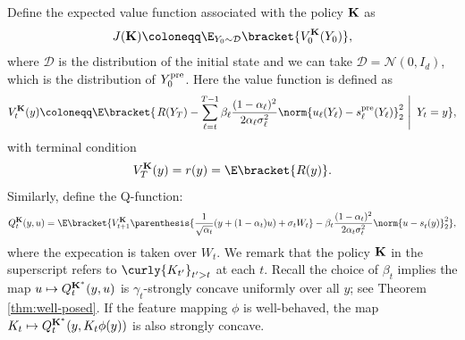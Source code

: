\documentclass{article}
\begin{document}
Define the expected value function associated with the policy ${\bf K}$ as
\begin{align*}
    J({\bf K}) \coloneqq \E_{Y_0\sim \mathcal{D}}\bracket{V_0^{\bf K}(Y_0)},
\end{align*}
where $\mathcal{D}$ is the  distribution of the initial state and we can take $\mathcal{D}=\mathcal{N}(0,I_d)$, which is the distribution of $Y_0^{\rm pre}$. Here the value function is defined as
\begin{align*}
    V_t^{\bf K}(y) \coloneqq \E\bracket{\left. R(Y_T) - \sum_{\ell = t}^{T - 1}\beta_\ell \frac{(1 - \alpha_\ell)^2}{2\alpha_\ell \sigma_\ell^2}\norm{u_\ell(Y_{\ell}) - s_\ell^{\rm pre}(Y_{\ell})}_{2}^{2}\,\,\right|\,\, Y_t = y},
\end{align*}
with terminal condition
\begin{align*}
    V_T^{\bf K}(y) = r(y) = \E\bracket{R(y)}.
\end{align*}
Similarly, define the Q-function:
\begin{align*}
    Q_t^{\bf K}(y, u) = \E\bracket{V_{t+1}^{\bf K}\parenthesis{\frac{1}{\sqrt{\alpha_t}}(y + (1- \alpha_t)u) + \sigma_t W_t}-\beta_t\frac{(1 - \alpha_t)^2}{2\alpha_t\sigma_t^2}\norm{u - s_t^{\rm }(y)}_2^2},
\end{align*}
where the expecation is taken over $W_t$. 
%
%
%
%
We remark that the policy $ \bf K $ in the superscript refers to $ \curly{K_{t'}}_{t' > t} $ at each $t$. 
Recall the choice of $\beta_t$ implies the map $u \mapsto Q_t^{\bf K^*}(y, u)$ is $\gamma_t$-strongly concave uniformly over all $y$; see Theorem \ref{thm:well-posed}. If the feature mapping $\phi$ is well-behaved, the map $K_t \mapsto Q_t^{\bf K^{*}}(y, K_t\phi(y))$ is also strongly concave. 
\end{document}
